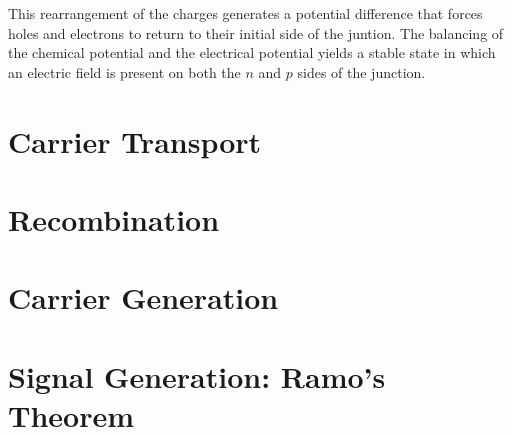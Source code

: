 This rearrangement of the charges generates a potential difference that forces holes and electrons to return to their initial side of the juntion. The balancing of the chemical potential and the electrical potential yields a stable state in which an electric field is present on both the $n$ and $p$ sides of the junction.  


\section{Carrier Transport}


\section{Recombination} 

\section{Carrier Generation}

\section{Signal Generation: Ramo's Theorem} %

